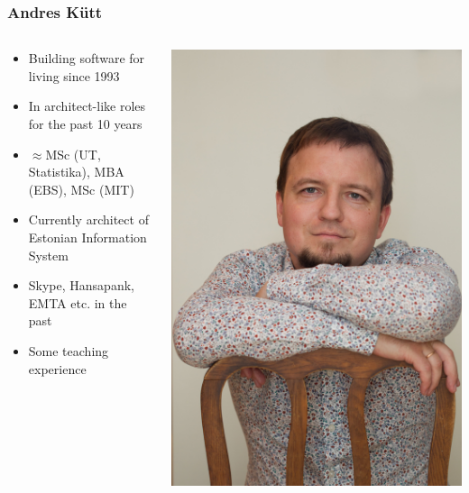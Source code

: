 \documentclass[10pt, compress]{beamer}
\begin{document}
\begin{frame}[fragile]
	\frametitle{Andres Kütt}
	\begin{columns}[t]
		\begin{column}{7cm}
			\begin{itemize}
				\item Building software for living since 1993
				\item In architect-like roles for the past 10 years
				\item $\approx$MSc (UT, Statistika), MBA (EBS), MSc (MIT)
				\item Currently architect of Estonian Information System
				\item Skype, Hansapank, EMTA etc. in the past
				\item Some teaching experience
			\end{itemize}
		\end{column}
		\begin{column}[T]{3cm}
			\includegraphics[width=\textwidth]{author.jpg}
		\end{column}
	\end{columns}
\end{frame}
\end{document}
